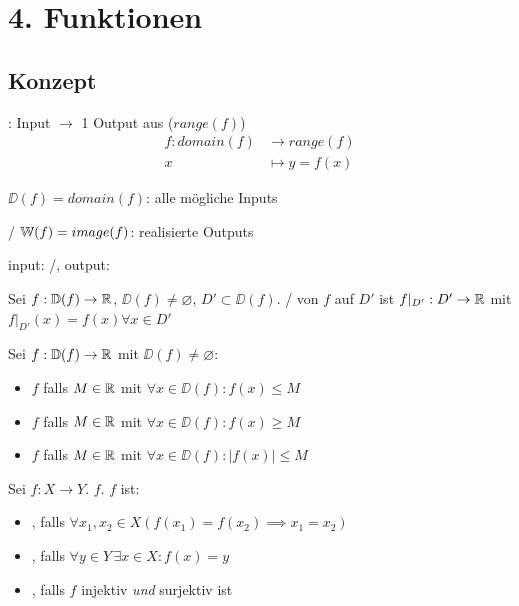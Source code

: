 \section{4. Funktionen}

\subsection{Konzept}

\Def {}: Input $\to$ 1 Output aus  ($range(f)$)
\begin{align*}
    f: domain(f) & \to range(f) \\
    x & \mapsto y = f(x)
\end{align*}

\Def {} $\DD(f) = domain(f)$: alle mögliche Inputs

\Def {}/ $\mathbb{W}(f) = image(f)$: realisierte Outputs

\Def input: /, output: 

\Def Sei $f: \mathbb{D}(f) \to \mathbb{R}$, $\DD(f)\ne \varnothing$, $D' \subset \DD(f)$.
/ von $f$ auf $D'$ ist $f\rvert_{D'} : D' \to \mathbb{R}$
mit $f\rvert_{D'}(x) = f(x) \forall x \in D'$

\Def Sei $f : \mathbb{D}(f) \to \mathbb{R}$ mit $\DD(f)\ne \varnothing$:
\vspace{-0.6em}
\begin{itemize}
    \item $f$  falls $M \in \mathbb{R}$ mit $\forall x \in \DD(f) : f(x)\le M$
    \item $f$  falls $M \in \mathbb{R}$ mit $\forall x \in \DD(f) : f(x)\ge M$
    \item $f$  falls $M \in \mathbb{R}$ mit $\forall x \in \DD(f) : |f(x)|\le M$
\end{itemize}

\Def Sei $f : X \to Y$. $f$. $f$ ist:
\vspace{-0.6em}
\begin{itemize}
    \item {}, falls $\forall x_1, x_2 \in X (f(x_1) = f(x_2) \implies x_1 = x_2)$
    \item {}, falls $\forall y \in Y \, \exists x \in X : f(x) = y$
    \item {}, falls $f$ injektiv \textit{und} surjektiv ist
\end{itemize}

